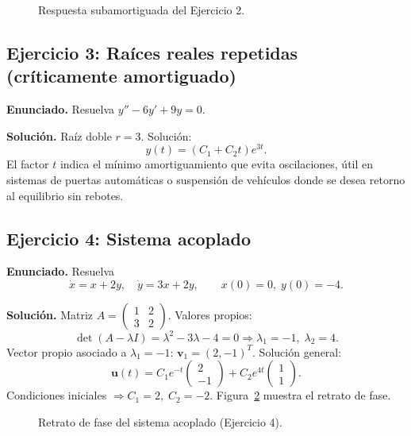 \documentclass[stu,12pt,a4paper,hidelinks]{apa7}
\begin{document}
\begin{figure}[H]
\centering
\caption{Respuesta subamortiguada del Ejercicio 2.}
\label{fig:ej2}
\end{figure}

\subsection{Ejercicio 3: Raíces reales repetidas (críticamente amortiguado)}
\textbf{Enunciado.} Resuelva $y''-6y'+9y=0$.

\textbf{Solución.}
Raíz doble $r=3$. Solución:
\[
y(t)=(C_1+C_2 t)e^{3t}.
\]
El factor $t$ indica el mínimo amortiguamiento que evita oscilaciones, útil en sistemas de puertas automáticas o suspensión de vehículos donde se desea retorno al equilibrio sin rebotes.

\subsection{Ejercicio 4: Sistema acoplado}
\textbf{Enunciado.} Resuelva
\[
\dot x = x + 2y,\quad \dot y = 3x + 2y,\qquad x(0)=0,\;y(0)=-4.
\]

\textbf{Solución.}
Matriz $A=\begin{pmatrix}1 & 2 \\ 3 & 2\end{pmatrix}$. Valores propios:
\[
\det(A-\lambda I)=\lambda^2-3\lambda-4=0\Rightarrow \lambda_1=-1,\;\lambda_2=4.
\]
Vector propio asociado a $\lambda_1=-1$: $\mathbf{v}_1=(2,-1)^T$. Solución general:
\[
\mathbf{u}(t)=C_1 e^{-t}\begin{pmatrix}2\\-1\end{pmatrix}+C_2 e^{4t}\begin{pmatrix}1\\1\end{pmatrix}.
\]
Condiciones iniciales $\Rightarrow C_1=2,\;C_2=-2$. Figura~\ref{fig:ej4} muestra el retrato de fase.

\begin{figure}[H]
\centering
\caption{Retrato de fase del sistema acoplado (Ejercicio 4).}
\label{fig:ej4}
\end{figure}

\end{document}
